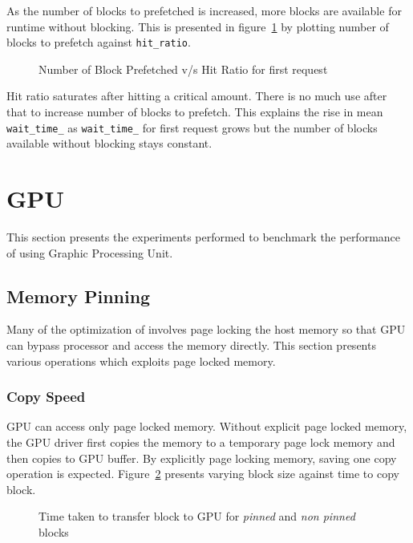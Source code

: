 As the number of blocks to prefetched is increased, more blocks are available for
runtime without blocking. This is presented in figure~\ref{fig:look_ahead_hit_ratio}
by plotting number of blocks to prefetch against \texttt{hit\_ratio}.

\begin{figure}[h]
  
  \caption{Number of Block Prefetched v/s Hit Ratio for first request}
  \label{fig:look_ahead_hit_ratio}
\end{figure}

Hit ratio saturates after hitting a critical amount. There is no much use after
that to increase number of blocks to prefetch. This explains the rise in mean
\texttt{wait\_time\_} as \texttt{wait\_time\_} for first request grows but the
number of blocks available without blocking stays constant.

\section{GPU}
This section presents the experiments performed to benchmark the performance of
using Graphic Processing Unit.
\subsection{Memory Pinning}
Many of the optimization of involves page locking the host memory so that GPU can
bypass processor and access the memory directly. This section presents various
operations which exploits page locked memory.
\subsubsection{Copy Speed}
GPU can access only page locked memory. Without explicit page locked memory, the
GPU driver first copies the memory to a temporary page lock memory and then copies
to GPU buffer. By explicitly page locking memory, saving one copy operation is expected.
Figure~\ref{fig:mempin_block_copy} presents varying block size against time to
copy block.

\begin{figure}[h]
  
  \caption{Time taken to transfer block to GPU for \textit{pinned} and \textit{non pinned} blocks}
  \label{fig:mempin_block_copy}
\end{figure}

